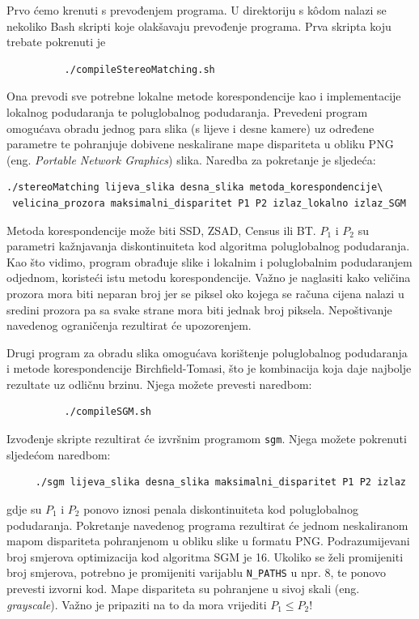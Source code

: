 \documentclass[utf8, zavrsni, numeric]{fer}
\begin{document}
Prvo ćemo krenuti s prevođenjem programa. U direktoriju s k\^odom nalazi se nekoliko Bash skripti koje olakšavaju prevođenje programa. Prva skripta koju trebate pokrenuti je
\begin{verbatim}
          ./compileStereoMatching.sh
\end{verbatim}
Ona prevodi sve potrebne lokalne metode korespondencije kao i implementacije lokalnog podudaranja te poluglobalnog podudaranja. Prevedeni program omogućava obradu jednog para slika (s lijeve i desne kamere) uz određene parametre te pohranjuje dobivene neskalirane mape dispariteta
u obliku PNG (eng. {\sl Portable Network Graphics}) slika. Naredba za pokretanje je sljedeća:
\begin{verbatim}
./stereoMatching lijeva_slika desna_slika metoda_korespondencije\
 velicina_prozora maksimalni_disparitet P1 P2 izlaz_lokalno izlaz_SGM
\end{verbatim}
Metoda korespondencije može biti SSD, ZSAD, Census ili BT. $P_1$ i $P_2$ su parametri kažnjavanja
diskontinuiteta kod algoritma poluglobalnog podudaranja. Kao što vidimo, program obrađuje slike
i lokalnim i poluglobalnim podudaranjem odjednom, koristeći istu metodu korespondencije.
Važno je naglasiti kako veličina prozora mora biti neparan broj jer se piksel oko kojega se računa cijena nalazi u sredini prozora pa sa svake strane mora biti jednak broj piksela.
Nepoštivanje navedenog ograničenja rezultirat će upozorenjem.

Drugi program za obradu slika omogućava korištenje poluglobalnog podudaranja i metode korespondencije Birchfield-Tomasi, što je kombinacija koja daje najbolje rezultate uz odličnu brzinu.
Njega možete prevesti naredbom:
\begin{verbatim}
          ./compileSGM.sh
\end{verbatim}

Izvođenje skripte rezultirat će izvršnim programom {\tt sgm}. Njega možete pokrenuti sljedećom naredbom:
\begin{verbatim}
     ./sgm lijeva_slika desna_slika maksimalni_disparitet P1 P2 izlaz
\end{verbatim}
gdje su $P_1$ i $P_2$ ponovo iznosi penala diskontinuiteta kod poluglobalnog podudaranja.
Pokretanje navedenog programa rezultirat će jednom neskaliranom mapom dispariteta pohranjenom
u obliku slike u formatu PNG.
Podrazumijevani broj smjerova optimizacija kod algoritma SGM je 16. Ukoliko se želi promijeniti
broj smjerova, potrebno je promijeniti varijablu {\verb|N_PATHS|} u npr. 8, te ponovo prevesti izvorni kod. Mape dispariteta su pohranjene u sivoj skali (eng. {\sl grayscale}).
Važno je pripaziti na to da mora vrijediti $P_1 \leq P_2$\/!
\end{document}
